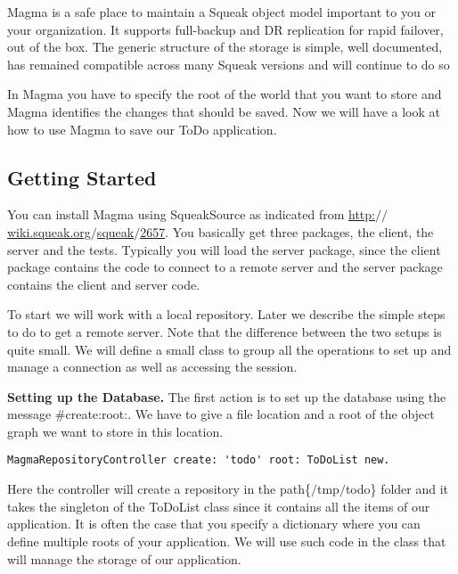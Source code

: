 \documentclass[a4paper,10pt,twoside]{book}
\newcommand{\ct}[1]{{\small\ttfamily\textup{#1}}}
\begin{document}
Magma is a safe place to maintain a Squeak object model important to you or your organization. It supports full-backup and DR replication for rapid failover, out of the box. The generic structure of the storage is simple, well documented, has remained compatible across many Squeak versions and will continue to do so

In Magma you have to specify the root of the world that you want to store and Magma identifies the changes that should be saved. Now we will have a look at how to use Magma to save our ToDo application.

\subsection{Getting Started}
\label{book:advanced:persistency:magma:gettingstarted}

You can install Magma using SqueakSource as indicated from \href{http://wiki.squeak.org/squeak/2657}{http:$/$$/$wiki.squeak.org$/$squeak$/$2657}. You basically get three packages, the client, the server and the tests. Typically you will load the server package, since the client package contains the code to connect to a remote server and the server package contains the client and server code.

To start we will work with a local repository. Later we describe the simple steps to do to get a remote server. Note that the difference between the two setups is quite small. We will define a small class to group all the operations to set up and manage a connection as well as accessing the session.

\textbf{Setting up the Database.} The first action is to set up the database using the message \ct{\#create:root:}. We have to give a file location and a root of the object graph we want to store in this location.

\begin{lstlisting}
MagmaRepositoryController create: 'todo' root: ToDoList new.
\end{lstlisting}

Here the controller will create a repository in the path\{$/$tmp$/$todo\} folder and it takes the singleton of the \ct{ToDoList} class since it contains all the items of our application. It is often the case that you specify a dictionary where you can define multiple roots of your application. We will use such code in the class that will manage the storage of our application.
\end{document}
